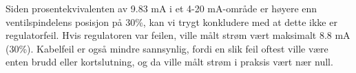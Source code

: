 \vskip 10pt

Siden prosentekvivalenten av 9.83 mA i et 4-20 mA-område er høyere enn ventilspindelens posisjon på 30\%, kan vi trygt konkludere med at dette ikke er regulatorfeil. Hvis regulatoren var feilen, ville målt strøm vært maksimalt 8.8 mA (30\%). Kabelfeil er også mindre sannsynlig, fordi en slik feil oftest ville være enten brudd eller kortslutning, og da ville målt strøm i praksis vært nær null.




